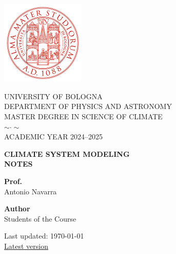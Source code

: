 \pagestyle{empty}


\titleformat{\section}[block]{\centering\bfseries\Large}{}{0pt}{}


\begin{titlepage}

	\setlength{\parindent}{0pt}

	\begin{center}
		\includegraphics[width=0.3\textwidth]{setup/unibo-red} %
	\end{center}

	\begin{center}
		\Large UNIVERSITY OF BOLOGNA \\[0.5em]
		\large DEPARTMENT OF PHYSICS AND ASTRONOMY \\[0.5em]
		\large MASTER DEGREE IN SCIENCE OF CLIMATE \\[1em]
		$\sim \cdot \sim$ \\[1em]
		\large ACADEMIC YEAR 2024--2025
	\end{center}

	\vfill

	\begin{center}
		{\LARGE \textbf{CLIMATE SYSTEM MODELING}} \\[0.5em]
		{\LARGE \textbf{NOTES}}
	\end{center}

	\vfill

	\noindent
	\begin{minipage}[t]{0.48\textwidth}
		\raggedright
		\textbf{Prof.} \\
		Antonio Navarra
	\end{minipage}%
	\hfill
	\begin{minipage}[t]{0.48\textwidth}
		\raggedleft
		\textbf{Author} \\
		Students of the Course \\

	\end{minipage}


	\vfill

	\begin{center}
		Last updated:
		\today \\
		\href{https://niccolozanotti.github.io/climate-modeling/notes.pdf}{Latest version}
	\end{center}

	\restoregeometry

\end{titlepage}


\titleformat{\section}[block]{\normalfont\Large\bfseries}{\thesection}{1em}{}
